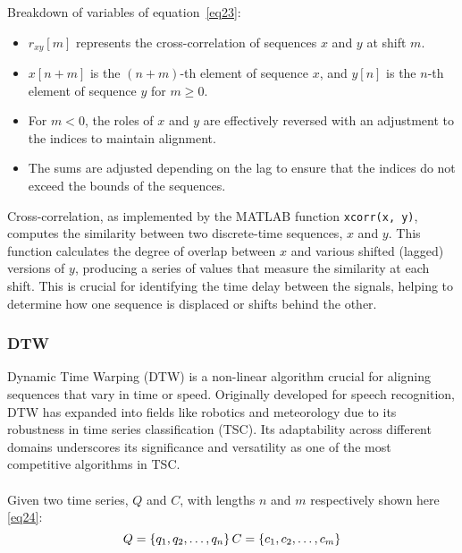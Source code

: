 \noindent Breakdown of variables of equation~\ref{eq23}:
\begin{itemize}
    \item \( r_{xy}[m] \) represents the cross-correlation of sequences \( x \) and \( y \) at shift \( m \).
    \item \( x[n+m] \) is the \( (n+m) \)-th element of sequence \( x \), and \( y[n] \) is the \( n \)-th element of sequence \( y \) for \( m \geq 0 \).
    \item For \( m < 0 \), the roles of \( x \) and \( y \) are effectively reversed with an adjustment to the indices to maintain alignment.
    \item The sums are adjusted depending on the lag to ensure that the indices do not exceed the bounds of the sequences.
\end{itemize}

Cross-correlation, as implemented by the MATLAB function \texttt{xcorr(x, y)}, computes the similarity between two discrete-time sequences, \( x \) and \( y \). This function calculates the degree of overlap between \( x \) and various shifted (lagged) versions of \( y \), producing a series of values that measure the similarity at each shift. This is crucial for identifying the time delay between the signals, helping to determine how one sequence is displaced or shifts behind the other.

\subsubsection{DTW}

Dynamic Time Warping (DTW) is a non-linear algorithm crucial for aligning sequences that vary in time or speed. Originally developed for speech recognition, DTW has expanded into fields like robotics and meteorology due to its robustness in time series classification (TSC). Its adaptability across different domains underscores its significance and versatility as one of the most competitive algorithms in TSC.

\paragraph{}
Given two time series, \( Q \) and \( C \), with lengths \( n \) and \( m \) respectively shown here \ref{eq24}:
\begin{equation}
\label{eq24}
Q=\left\{q_1, q_2, \ldots, q_n\right\} \\
C=\left\{c_1, c_2, \ldots, c_m\right\}
\end{equation}

